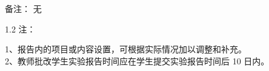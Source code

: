 \documentclass[12pt, a4paper]{article}
\begin{document}
\begin{labbox}{备注：}{}
    无
\end{labbox}

\begin{spacing}{1.2}
    \noindent 注：\begin{minipage}[t]{0.88\textwidth}
        1、报告内的项目或内容设置，可根据实际情况加以调整和补充。\\
        2、教师批改学生实验报告时间应在学生提交实验报告时间后 10 日内。
    \end{minipage}
\end{spacing}
\end{document}

